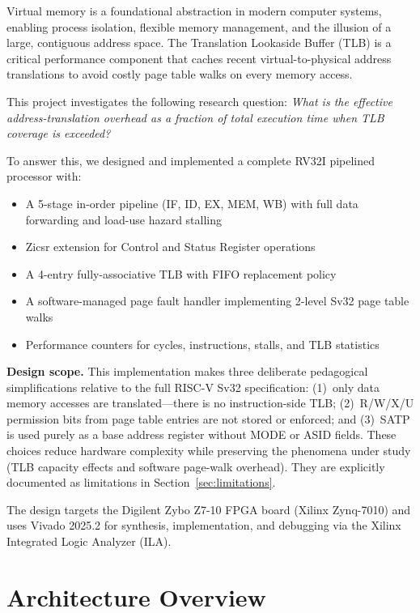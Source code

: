 \documentclass[conference]{IEEEtran}
\begin{document}
Virtual memory is a foundational abstraction in modern computer systems, enabling process isolation, flexible memory management, and the illusion of a large, contiguous address space. The Translation Lookaside Buffer (TLB) is a critical performance component that caches recent virtual-to-physical address translations to avoid costly page table walks on every memory access.

This project investigates the following research question: \textit{What is the effective address-translation overhead as a fraction of total execution time when TLB coverage is exceeded?}

To answer this, we designed and implemented a complete RV32I pipelined processor with:
\begin{itemize}
    \item A 5-stage in-order pipeline (IF, ID, EX, MEM, WB) with full data forwarding and load-use hazard stalling
    \item Zicsr extension for Control and Status Register operations
    \item A 4-entry fully-associative TLB with FIFO replacement policy
    \item A software-managed page fault handler implementing 2-level Sv32 page table walks
    \item Performance counters for cycles, instructions, stalls, and TLB statistics
\end{itemize}

\textbf{Design scope.} This implementation makes three deliberate pedagogical simplifications relative to the full RISC-V Sv32 specification: (1)~only data memory accesses are translated---there is no instruction-side TLB; (2)~R/W/X/U permission bits from page table entries are not stored or enforced; and (3)~SATP is used purely as a base address register without MODE or ASID fields. These choices reduce hardware complexity while preserving the phenomena under study (TLB capacity effects and software page-walk overhead). They are explicitly documented as limitations in Section~\ref{sec:limitations}.

The design targets the Digilent Zybo Z7-10 FPGA board (Xilinx Zynq-7010) and uses Vivado 2025.2 for synthesis, implementation, and debugging via the Xilinx Integrated Logic Analyzer (ILA).

\section{Architecture Overview}
\end{document}
